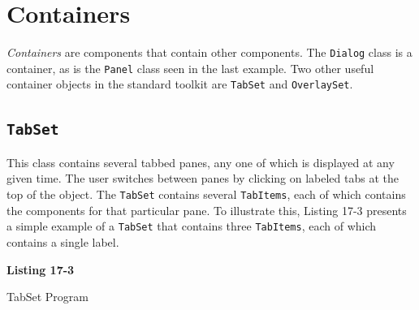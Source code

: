 \section{Containers}

\textit{Containers} are components that contain other components.
The \texttt{Dialog} class is a container, as is
the \texttt{Panel} class seen in the last example.
Two other useful container objects in the standard toolkit are \texttt{TabSet}
and \texttt{OverlaySet}.

\subsection{\texttt{TabSet}}

This class contains several tabbed panes, any one of which
is displayed at any given time. The user switches between panes by clicking on
labeled tabs at the top of the object. The \texttt{TabSet} contains several
\texttt{TabItems}, each of which contains the components for that particular
pane. To illustrate this, Listing 17-3 presents a simple example of a
\texttt{TabSet} that contains three \texttt{TabItems}, each of which contains a
single label.

\bigskip

{\sffamily\bfseries
Listing 17-3

TabSet Program}

